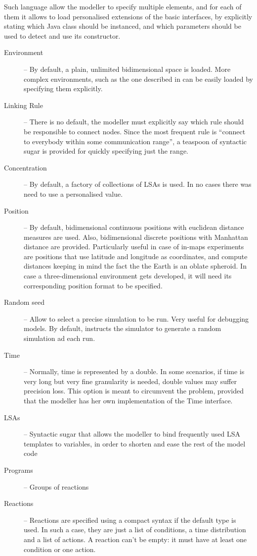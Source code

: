 \documentclass[12pt,a4paper,twoside,openright]{book}
\begin{document}
Such language allow the modeller to specify multiple elements, and for each of them it allows to load personalised extensions of the basic interfaces, by explicitly stating which Java class should be instanced, and which parameters should be used to detect and use its constructor.
\begin{description}
 \item[Environment] -- By default, a plain, unlimited bidimensional space is loaded. More complex environments, such as the one described in  can be easily loaded by specifying them explicitly.
 \item[Linking Rule] -- There is no default, the modeller must explicitly say which rule should be responsible to connect nodes. Since the most frequent rule is ``connect to everybody within some communication range'', a teaspoon of syntactic sugar is provided for quickly specifying just the range.
 \item[Concentration] -- By default, a factory of collections of LSAs is used. In no cases there was need to use a personalised value.
 \item[Position] -- By default, bidimensional continuous positions with euclidean distance measures are used. Also, bidimensional discrete positions with Manhattan distance are provided. Particularly useful in case of in-maps experiments are positions that use latitude and longitude as coordinates, and compute distances keeping in mind the fact the the Earth is an oblate spheroid. In case a three-dimensional environment gets developed, it will need its corresponding position format to be specified.
 \item[Random seed] -- Allow to select a precise simulation to be run. Very useful for debugging models. By default, instructs the simulator to generate a random simulation ad each run.
 \item[Time] -- Normally, time is represented by a double. In some scenarios, if time is very long but very fine granularity is needed, double values may suffer precision loss. This option is meant to circumvent the problem, provided that the modeller has her own implementation of the Time interface.
 \item[LSAs] -- Syntactic sugar that allows the modeller to bind frequently used LSA templates to variables, in order to shorten and ease the rest of the model code
 \item[Programs] -- Groups of reactions
 \item[Reactions] -- Reactions are specified using a compact syntax if the default type is used. In such a case, they are just a list of conditions, a time distribution and a list of actions. A reaction can't be empty: it must have at least one condition or one action.

\end{description}
\end{document}

